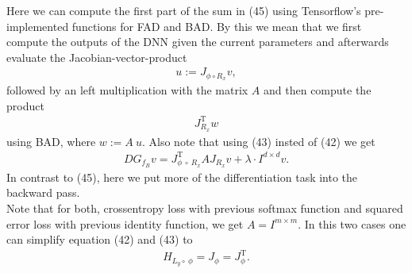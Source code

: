 \documentclass[conference]{IEEEtran}
\begin{document}
Here we can compute the first part of the sum in (45) using Tensorflow's pre-implemented functions for FAD and BAD. By this we mean that we first compute the outputs of the DNN given the current parameters and afterwards evaluate the Jacobian-vector-product 
\begin{align}
u := J_{\phi\circ R _{x}}v,
\end{align}
followed by an left multiplication with the matrix $A$ and then compute the product 
\begin{align}
J_{R_{x}}^{\mathrm{T}}w
\end{align}
using BAD, where $w := A\:u$. Also note that using (43) insted of (42) we get 
\begin{align}
DG_{f_{B}}v  = J_{\phi\:\circ\:R _{x}}^{\mathrm{T}}AJ_{R _{x}}v + \lambda\cdot I^{d\times d}v.
\end{align}
In contrast to (45), here we put more of the differentiation task into the backward pass.\\ 
Note that for both, crossentropy loss with previous softmax function and squared error loss with previous identity function, we get $A = I^{m\times m}$. In this two cases one can simplify equation (42) and (43) to 
\begin{align}
H_{L_{y}\circ\:\phi} = J_{\phi} = J_{\phi}^{\mathrm{T}}.
\end{align}
\end{document}
